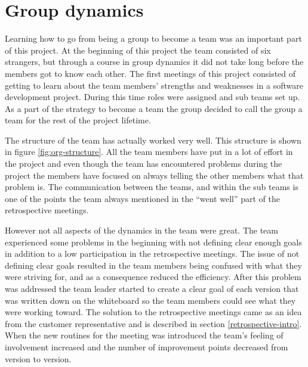 \section{Group dynamics}
\label{group-dynamics}
Learning how to go from being a group to become a team was an important part of this project. At the beginning of this project the team consisted of six strangers, but through a course in group dynamics it did not take long before the members got to know each other. The first meetings of this project consisted of getting to learn about the team members’ strengths and weaknesses in a software development project. During this time roles were assigned and sub teams set up. As a part of the strategy to become a team the group decided to call the group a team for the rest of the project lifetime.

The structure of the team has actually worked very well. This structure is shown in figure \ref{fig:org-structure}. All the team members have put in a lot of effort in the project and even though the team has encountered problems during the project the members have focused on always telling the other members what that problem is. The communication between the teams, and within the sub teams is one of the points the team always mentioned in the “went well” part of the retrospective meetings. 

However not all aspects of the dynamics in the team were great. The team experienced some problems in the beginning with not defining clear enough goals in addition to a low participation in the retrospective meetings. The issue of not defining clear goals resulted in the team members being confused with what they were striving for, and as a consequence reduced the efficiency. After this problem was addressed the team leader started to create a clear goal of each version that was written down on the whiteboard so the team members could see what they were working toward. The solution to the retrospective meetings came as an idea from the customer representative and is described in section \ref{retrospective-intro}. When the new routines for the meeting was introduced the team’s feeling of involvement increased and the number of improvement points decreased from version to version.


